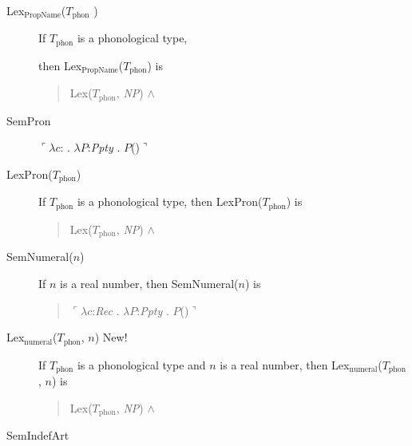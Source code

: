 \begin{description}
\item[\textnormal{Lex$_{\mathrm{PropName}}$($T_{\mathrm{phon}}$
    )}] \mbox{}

  If $T_{\mathrm{phon}}$ is a phonological type,

  then Lex$_{\mathrm{PropName}}$($T_{\mathrm{phon}}$) is
  \begin{quote}
    Lex($T_{\mathrm{phon}}$, \textit{NP}) \d{$\wedge$}
\end{quote}

\item[\textnormal{SemPron} ] \mbox{}

$\ulcorner\lambda c$: . $\lambda
  P$:\textit{Ppty}
  . $P$()$\urcorner$

\item[\textnormal{LexPron($T_{\text{phon}}$)}] \mbox{}

If $T_{\text{phon}}$ is a phonological type, then
LexPron($T_{\text{phon}}$) is
\begin{quote}
Lex($T_{\mathrm{phon}}$, \textit{NP}) \d{$\wedge$}
\end{quote}

\item[\textnormal{SemNumeral($n$)}] \mbox{}

  If $n$ is a real number, then SemNumeral($n$) is
  \begin{quote}
    $\ulcorner\lambda c$:\textit{Rec} . $\lambda P$:\textit{Ppty}
    . $P$()$\urcorner$
  \end{quote}

  
\item[\textnormal{Lex$_{\mathrm{numeral}}$($T_{\mathrm{phon}}$, $n$)}
    New!] \mbox{}

    If $T_{\mathrm{phon}}$ is a phonological type and $n$ is a real
    number, then Lex$_{\mathrm{numeral}}$($T_{\mathrm{phon}}$, $n$) is
    \begin{quote}
      Lex($T_{\mathrm{phon}}$, \textit{NP}) \d{$\wedge$}
    \end{quote}
    

  
\item[\textnormal{SemIndefArt}] \mbox{}


\end{description}
